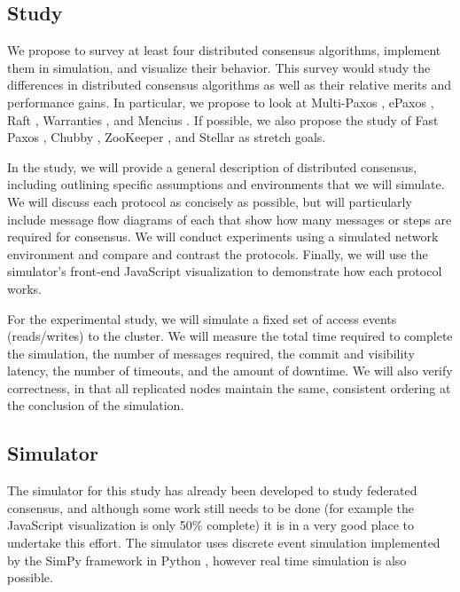 \documentclass[11pt,letterpaper]{article}
\begin{document}
\subsection*{Study}

We propose to survey at least four distributed consensus algorithms, implement them in simulation, and visualize their behavior. This survey would study the differences in distributed consensus algorithms as well as their relative merits and performance gains. In particular, we propose to look at Multi-Paxos \cite{chandra_paxos_2007}, ePaxos \cite{moraru_there_2013}, Raft \cite{ongaro_search_2014}, Warranties \cite{liu_warranties_2014}, and Mencius \cite{mao_mencius_2008}. If possible, we also propose the study of Fast Paxos \cite{lamport_fast_2006}, Chubby \cite{burrows_chubby_2006}, ZooKeeper \cite{hunt_zookeeper_2010}, and Stellar \cite{mazieres_stellar_2015} as stretch goals.

In the study, we will provide a general description of distributed consensus, including outlining specific assumptions and environments that we will simulate. We will discuss each protocol as concisely as possible, but will particularly include message flow diagrams of each that show how many messages or steps are required for consensus. We will conduct experiments using a simulated network environment and compare and contrast the protocols. Finally, we will use the simulator's front-end JavaScript visualization to demonstrate how each protocol works.

For the experimental study, we will simulate a fixed set of access events (reads/writes) to the cluster. We will measure the total time required to complete the simulation, the number of messages required, the commit and visibility latency, the number of timeouts, and the amount of downtime. We will also verify correctness, in that all replicated nodes maintain the same, consistent ordering at the conclusion of the simulation.

\subsection*{Simulator}

The simulator for this study has already been developed to study federated consensus, and although some work still needs to be done (for example the JavaScript visualization is only 50\% complete) it is in a very good place to undertake this effort. The simulator uses discrete event simulation implemented by the SimPy framework in Python \cite{muller_simpy_2003,muller_simpy_2015}, however real time simulation is also possible.
\end{document}
